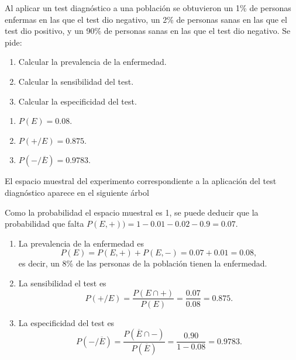 {Al aplicar un test diagnóstico a una población se obtuvieron un 1\% de personas enfermas en las que el test dio negativo, un 2\% de
personas sanas en las que el test dio positivo, y un 90\% de personas sanas en las que el test dio negativo.  
Se pide:
\begin{enumerate}
\item Calcular la prevalencia de la enfermedad.
\item Calcular la sensibilidad del test.
\item Calcular la especificidad del test.
\end{enumerate} 
} 
{\begin{enumerate}
\item $P(E)=0.08$.
\item $P(+/E) = 0.875$.
\item $P(-/\overline{E})= 0.9783$.
\end{enumerate}
}
{El espacio muestral del experimento correspondiente a la aplicación del test diagnóstico aparece en el siguiente árbol
\begin{center}
\renewcommand{\psedge}[2]{\ncdiag[armA=0.8cm,angleA=180,angleB=0,armB=0cm]{#2}{#1}} 
\end{center}

Como la probabilidad el espacio muestral es 1, se puede deducir que la probabilidad que falta $P(E,+))= 1- 0.01 -0.02 -0.9 = 0.07$.

\begin{enumerate}
\item La prevalencia de la enfermedad es 
\[
P(E) = P(E,+)+P(E,-) = 0.07 + 0.01 = 0.08,
\]
es decir, un 8\% de las personas de la población tienen la enfermedad.

\item La sensibilidad el test es
\[
P(+/E) = \frac{P(E\cap +)}{P(E)} = \frac{0.07}{0.08} = 0.875.
\]

\item La especificidad del test es 
\[
P(-/\overline{E}) = \frac{P(\overline E\cap -)}{P(\overline E)} = \frac{0.90}{1-0.08} = 0.9783.
\]
\end{enumerate}
}



